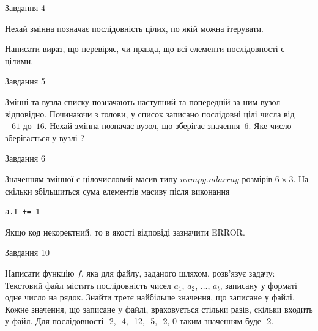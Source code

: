 \documentclass[12pt, ukrainian]{article}
\begin{document}
{\begin{minipage}[t]{8.0cm}
\end{minipage}


               
{\begin{center}Завдання {4}\end{center}}
\vspace{-4mm}
Нехай змінна  позначає послідовність цілих, по якій можна ітерувати.

Написати вираз, що перевіряє, чи правда, що всі елементи послідовності є цілими.\par

\vspace{10mm}
               
{\begin{center}Завдання {5}\end{center}}
\vspace{-4mm}
Змінні  та  вузла списку позначають наступний та попередній за ним вузол відповідно. Починаючи з голови, у список записано послідовні цілі числа від~$-61$ до~$16$. Нехай змінна  позначає вузол, що зберігає значення~$6$.
Яке число зберігається у вузлі  ?\par

               
{\begin{center}Завдання {6}\end{center}}
\vspace{-4mm}
Значенням змінної  є цілочисловий масив типу $numpy.ndarray$ розмірів $6{\times}3$. На скільки збільшиться сума елементів масиву  після виконання
\begin{verbatim}
a.T += 1
\end{verbatim}


Якщо код некоректний, то в якості відповіді зазначити ERROR.\par

               
{\begin{center}Завдання {10}\end{center}}
\vspace{-4mm}

Написати функцію $f$, яка для файлу, заданого шляхом, розв’язує задачу:\\ Текстовий файл містить послідовність чисел $a_1$, $a_2$, $\ldots$, $a_t$, записану у форматі одне число на рядок. Знайти третє найбільше значення, що записане у файлі. Кожне значення, що записане у файлі, враховується стільки разів, скільки входить у файл. Для послідовності -2, -4, -12, -5, -2, 0 таким значенням буде -2.

}
\end{document}
